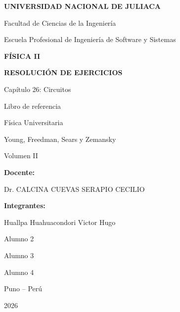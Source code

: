 \begin{titlepage}

\begin{center}


\vspace{0.5cm}

{\Large \textbf{UNIVERSIDAD NACIONAL DE JULIACA}}

\vspace{0.3cm}

{\large Facultad de Ciencias de la Ingeniería}

{\large Escuela Profesional de Ingeniería de Software y Sistemas}

\vfill

{\Large \textbf{FÍSICA II}}

\vspace{1cm}

{\Huge \textbf{RESOLUCIÓN DE EJERCICIOS}}

\vspace{0.4cm}

{\Large Capítulo 26: Circuitos}

\vspace{0.8cm}

{\large Libro de referencia}

\vspace{0.2cm}

{\large Física Universitaria}

{\large Young, Freedman, Sears y Zemansky}

{\large Volumen II}

\vfill

\begin{flushleft}

\textbf{Docente:}

Dr. CALCINA CUEVAS SERAPIO CECILIO

\vspace{0.8cm}

\textbf{Integrantes:}

Huallpa Huahuacondori Victor Hugo

Alumno 2

Alumno 3

Alumno 4

\end{flushleft}

\vfill

{\large Puno -- Perú}

{\large 2026}

\end{center}

\end{titlepage}